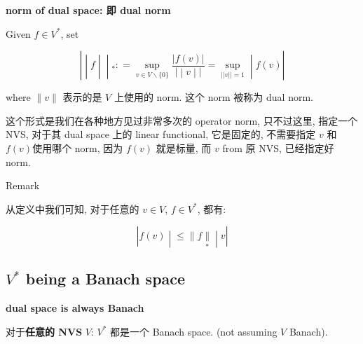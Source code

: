 \documentclass{qlnotes-export}
\begin{document}
\begin{definition}{\protect{}\label{kn-norm-of-dual-space-dual-norm}{\textbf{norm
of dual space: 即 \textbf{dual norm}}}}

Given \(f \in V^{\ast}\), set

\[\left. | \middle| f \middle| \middle| {}_{\ast}: = \sup\limits_{v \in V\backslash{\{ 0\}}}\frac{|f(v)|}{\left. | \middle| v \middle| | \right.} = \sup\limits_{||v|| = 1} \middle| f(v)| \right.\]

where \(\parallel v \parallel\) 表示的是 \(V\) 上使用的 norm. 这个 norm 被称为 dual norm.

\end{definition}

这个形式是我们在各种地方见过非常多次的{ }\textbf{} operator norm, 只不过这里, 指定一个 NVS, 对于其 dual space 上的 linear functional, 它是固定的, 不需要指定 \(v\) 和 \(f(v)\)使用哪个 norm, 因为 \(f(v)\) 就是标量, 而 \(v\) from 原 NVS, 已经指定好 norm.

\begin{qlremark}{Remark}

从定义中我们可知, 对于任意的 \(v \in V\), \(f \in V^{\ast}\), 都有:

\[\left. |f(v) \middle| \leq \parallel f\underset{\ast}{\parallel} \middle| v| \right.\]

\end{qlremark}

\subsection{\texorpdfstring{\(V^{\ast}\) being a Banach space}{V\^{}\{\textbackslash ast\} being a Banach space}}\label{vast-being-a-banach-space}

\begin{theorem}{\protect{}\label{kn-dual-space-is-always-banach}{\textbf{dual
space is always Banach}}}

对于\textbf{任意的 NVS} \(V\): \(V^{\ast}\) 都是一个 Banach space. (not assuming \(V\) Banach).

\end{theorem}
\end{document}
